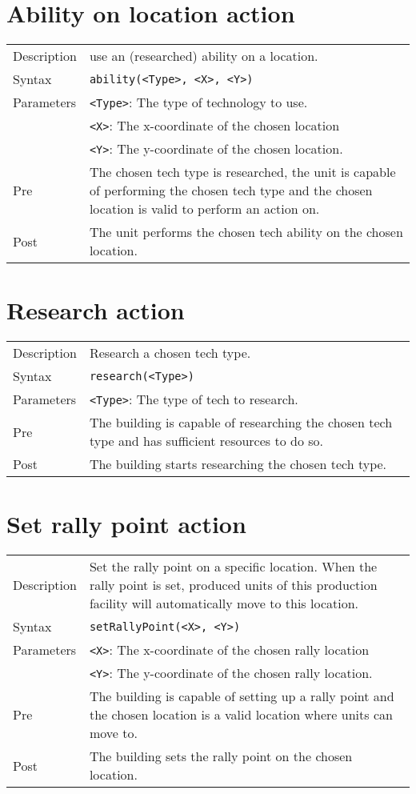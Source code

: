 \section{Ability on location action}
\begin{tabularx}{\textwidth}{lX}
 Description & use an (researched) ability on a location. \\
 Syntax & \verb|ability(<Type>, <X>, <Y>)| \\
 Parameters & \verb|<Type>|: The type of technology to use.\\
            & \verb|<X>|: The x-coordinate of the chosen location \\
            & \verb|<Y>|: The y-coordinate of the chosen location. \\
 Pre & The chosen tech type is researched, the unit is capable of performing the chosen tech type and the chosen location is valid to perform an action on. \\
 Post & The unit performs the chosen tech ability on the chosen location.
\end{tabularx}

\section{Research action}
\begin{tabularx}{\textwidth}{lX}
 Description & Research a chosen tech type. \\
 Syntax & \verb|research(<Type>)| \\
 Parameters & \verb|<Type>|: The type of tech to research.\\
 Pre & The building is capable of researching the chosen tech type and has sufficient resources to do so. \\
 Post & The building starts researching the chosen tech type.
\end{tabularx}

\section{Set rally point action}
\begin{tabularx}{\textwidth}{lX}
 Description & Set the rally point on a specific location. When the rally point is set, produced units of this production facility will automatically move to this location. \\
 Syntax & \verb|setRallyPoint(<X>, <Y>)| \\
 Parameters & \verb|<X>|: The x-coordinate of the chosen rally location \\
            & \verb|<Y>|: The y-coordinate of the chosen rally location. \\
 Pre & The building is capable of setting up a rally point and the chosen location is a valid location where units can move to. \\
 Post & The building sets the rally point on the chosen location.
\end{tabularx}


